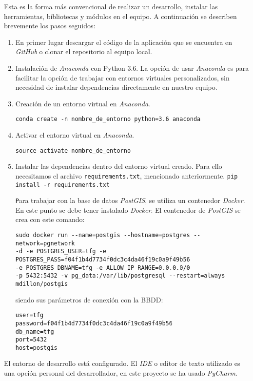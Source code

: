 Esta es la forma más convencional de realizar un desarrollo, instalar  las herramientas, bibliotecas y módulos en el equipo. A continuación se describen brevemente los pasos seguidos:

\begin{enumerate}

\item En primer lugar descargar el código de la aplicación que se encuentra en \emph{GitHub} o clonar el repositorio al equipo local.

\item Instalación de \emph{Anaconda} con Python 3.6. La opción de usar \emph{Anaconda} es para facilitar la opción de trabajar con entornos virtuales personalizados, sin necesidad de instalar dependencias directamente en nuestro equipo.

\item Creación de un entorno virtual en \emph{Anaconda}.

\texttt{conda create -n nombre\_de\_entorno python=3.6 anaconda}

\item Activar el entorno virtual en \emph{Anaconda}.

\texttt{source activate  nombre\_de\_entorno}

\item Instalar las dependencias dentro del entorno virtual creado. Para ello necesitamos el archivo \texttt{requirements.txt}, mencionado anteriormente.
\texttt{pip install -r requirements.txt}

\texttt Para trabajar con la base de datos \emph{PostGIS}, se utiliza un contenedor \emph{Docker}. En este punto se debe tener instalado \emph{Docker}. El contenedor de \emph{PostGIS} se crea con este comando:

\begin{verbatim}
sudo docker run --name=postgis --hostname=postgres --network=pgnetwork
-d -e POSTGRES_USER=tfg -e POSTGRES_PASS=f04f1b4d7734f0dc3c4da46f19c0a9f49b56
-e POSTGRES_DBNAME=tfg -e ALLOW_IP_RANGE=0.0.0.0/0 
-p 5432:5432 -v pg_data:/var/lib/postgresql --restart=always mdillon/postgis
\end{verbatim}

siendo sus parámetros de conexión con la BBDD:

\begin{verbatim}
user=tfg
password=f04f1b4d7734f0dc3c4da46f19c0a9f49b56
db_name=tfg
port=5432
host=postgis

\end{verbatim}


\end{enumerate}
El entorno de desarrollo está configurado. El \emph{IDE} o editor de texto utilizado es una opción personal del desarrollador, en este proyecto se ha usado \emph{PyCharm}.



